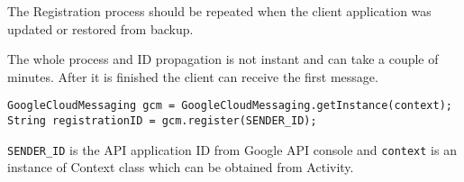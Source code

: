 The Registration process should be repeated when the client application was updated or restored from backup.

The whole process and ID propagation is not instant and can take a couple of minutes. After it is finished the client can receive the first message.

\begin{verbatim}
GoogleCloudMessaging gcm = GoogleCloudMessaging.getInstance(context);
String registrationID = gcm.register(SENDER_ID);
\end{verbatim}

\verb!SENDER_ID! is the API application ID from Google API console and \verb!context! is an instance of Context class which can be obtained from Activity.




